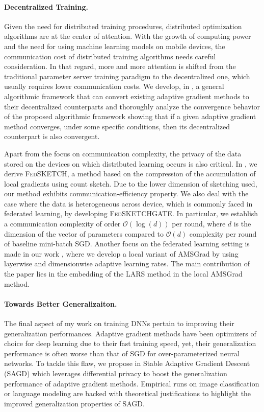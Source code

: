 \documentclass[twoside,11pt]{article}
\begin{document}
\vspace{0.08in}
\paragraph{Decentralized Training.} 
Given the need for distributed training procedures, distributed optimization algorithms are at the center of attention. 
With the growth of computing power and the need for using machine learning models on mobile devices, the communication cost of distributed training algorithms needs careful consideration. 
In that regard, more and more attention is shifted from the traditional parameter server training paradigm to the decentralized one, which usually requires lower communication costs.
We develop, in \citep{chen2020decent}, a general algorithmic framework that can convert existing adaptive gradient methods to their decentralized counterparts and thoroughly analyze the convergence behavior of the proposed algorithmic framework showing that if a given adaptive gradient method converges, under some specific conditions, then its decentralized counterpart is also convergent.

Apart from the focus on communication complexity, the privacy of the data stored on the devices on which distributed learning occurs is also critical.
In \citep{had2020}, we derive \textsc{FedSKETCH}, a method based on the compression of the accumulation of local gradients using count sketch.
Due to the lower dimension of sketching used, our method exhibits communication-efficiency property. We also deal with the case where the data is heterogeneous across device, which is commonly faced in federated learning, by developing \textsc{FedSKETCHGATE}.
In particular, we establish a communication complexity of order $\mathcal{O}(\log(d))$ per round, where $d$ is the dimension of the vector of parameters compared to $\mathcal{O}(d)$ complexity per round of baseline mini-batch SGD.
Another focus on the federated learning setting is made in our work \citep{karimi2020lars}, where we develop a local variant of AMSGrad by using layerwise and dimensionwise adaptive learning rates. The main contribution of the paper lies in the embedding of the LARS method in the local AMSGrad method.


\vspace{0.08in}
\paragraph{Towards Better Generalizaiton.} 
The final aspect of my work on training DNNs pertain to improving their generalization performances.
Adaptive gradient methods have been optimizers of choice for deep learning due to their fast training speed, yet, their generalization performance is often worse than that of SGD for over-parameterized neural networks. 
To tackle this flaw, we propose in \citep{zhou2020towards} Stable Adaptive Gradient Descent (\textsc{SAGD}) which leverages differential privacy to boost the generalization performance of adaptive gradient methods.
Empirical runs on image classification or language modeling are backed with theoretical justifications to highlight the improved generalization properties of \textsc{SAGD}.
\end{document}
